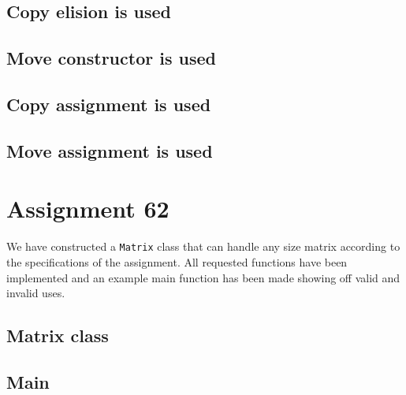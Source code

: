 \documentclass[11pt]{article}
\begin{document}
\subsection*{Copy elision is used}

\subsection*{Move constructor is used}

\subsection*{Copy assignment is used}

\subsection*{Move assignment is used}



\section*{Assignment 62}
We have constructed a \texttt{Matrix} class that can handle any size matrix according to the specifications of the assignment.
All requested functions have been implemented and an example main function has been made showing off valid and invalid uses.

\subsection*{Matrix class}
















\subsection*{Main}




\end{document}
